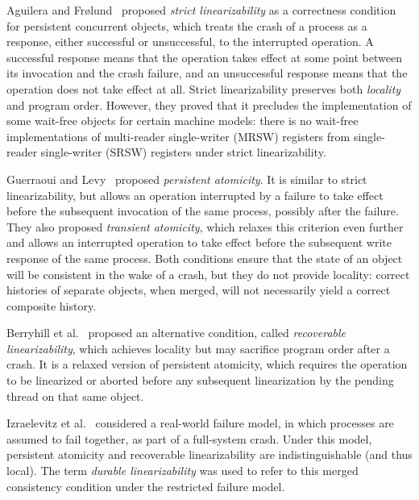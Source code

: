 Aguilera and Fr{\o}lund~\cite{Aguilera2003StrictLA}
proposed \emph{strict linearizability} as a correctness condition
for persistent concurrent objects,
which treats the crash of a process as a response,
either successful or unsuccessful, to the interrupted operation.
A successful response means that the operation takes effect at some point
between its invocation and the crash failure,
and an unsuccessful response means that the operation does not take effect at all.
Strict linearizability preserves both \emph{locality}~\cite{herlihy91waitfree}
and program order.
However, they proved that it precludes the implementation of
some wait-free objects for certain machine models:
there is no wait-free implementations of multi-reader single-writer (MRSW)
registers from single-reader single-writer (SRSW) registers under strict linearizability.

Guerraoui and Levy~\cite{DBLP:conf/icdcs/GuerraouiL04}
proposed \emph{persistent atomicity}.
It is similar to strict linearizability, but allows an operation
interrupted by a failure to take effect before
the subsequent invocation of the same process, possibly after the failure.
They also proposed \emph{transient atomicity},
which relaxes this criterion even further and allows an interrupted operation
to take effect before the subsequent write response of the same process.
Both conditions ensure that the state of an object will be consistent
in the wake of a crash, but they do not provide locality:
correct histories of separate objects, when merged,
will not necessarily yield a correct composite history.

Berryhill et al.~\cite{DBLP:conf/opodis/BerryhillGT15} proposed an alternative
condition, called \emph{recoverable linearizability},
which achieves locality but may sacrifice program order after a crash.
It is a relaxed version of persistent atomicity,
which requires the operation to be linearized or aborted before
any subsequent linearization by the pending thread on that same object.

Izraelevitz et al.~\cite{DBLP:conf/wdag/IzraelevitzMS16} considered
a real-world failure model, in which processes are assumed to fail together,
as part of a full-system crash.
Under this model, persistent atomicity and recoverable linearizability
are indistinguishable (and thus local).
The term \emph{durable linearizability} was used to refer to this merged
consistency condition under the restricted failure model.



